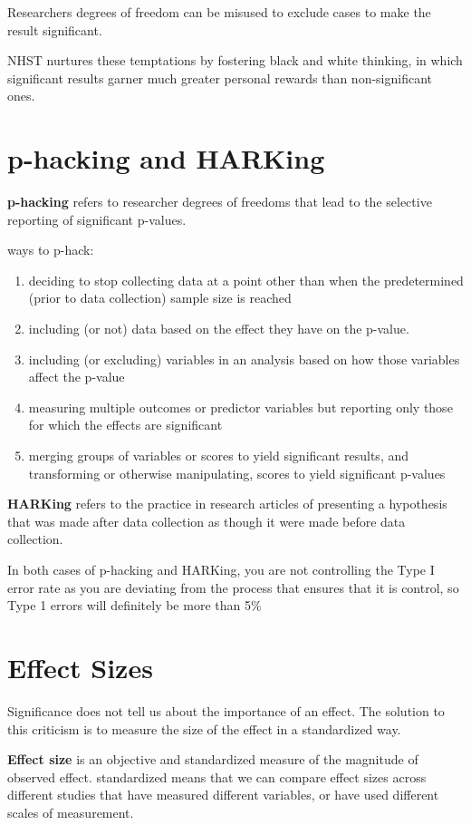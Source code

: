 Researchers degrees of freedom can be misused to exclude cases to make the result significant.

NHST nurtures these temptations by fostering black and white thinking, in which significant results garner much greater personal rewards than non-significant ones. 

\section{p-hacking and HARKing}
\textbf{p-hacking} refers to researcher degrees of freedoms that lead to the selective reporting of significant p-values.

ways to p-hack:
\begin{enumerate}
\item deciding to stop collecting data at a point other than when the predetermined (prior to data collection) sample size is reached
\item including (or not) data based on the effect they have on the p-value.
\item including (or excluding) variables in an analysis based on how those variables affect the p-value
\item measuring multiple outcomes or predictor variables but reporting only those for which the effects are significant
\item merging groups of variables or scores to yield significant results, and transforming or otherwise manipulating, scores to yield significant p-values
\end{enumerate}

\textbf{HARKing} refers to the practice in research articles of presenting a hypothesis that was made after data collection as though it were made before data collection.

In both cases of p-hacking and HARKing, you are not controlling the Type I error rate as you are deviating from the process that ensures that it is control, so Type 1 errors will definitely be more than 5\%

\section{Effect Sizes}
Significance does not tell us about the importance of an effect. The solution to this criticism is to measure the size of the effect in a standardized way. 

\textbf{Effect size} is an objective and standardized measure of the magnitude of observed effect. 
standardized means that we can compare effect sizes across different studies that have measured different variables, or have used different scales of measurement. 

